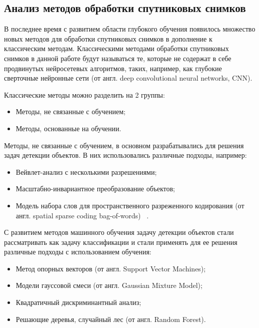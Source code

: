\documentclass[14pt, russian]{scrartcl}
\begin{document}
\subsection{Анализ методов обработки спутниковых снимков}

В последнее время с развитием области глубокого обучения появилось множество новых методов для обработки спутниковых снимков в дополнение к классическим методам. Классическими методами обработки спутниковых снимков в данной работе будут называться те, которые не содержат в себе продвинутых нейросетевых алгоритмов, таких, например, как глубокие сверточные нейронные сети (от англ. deep convolutional neural networks, CNN).

Классические методы можно разделить на 2 группы:

\begin{itemize}
    \item Методы, не связанные с обучением;
    \item Методы, основанные на обучении.
\end{itemize}

Методы, не связанные с обучением, в основном разрабатывались для решения задач детекции объектов. В них использовались различные подходы, например:

\begin{itemize}
    \item Вейвлет-анализ с несколькими разрешениями;
    \item Масштабно-инвариантное преобразование объектов;
    \item Модель набора слов для пространственного разреженного кодирования (от англ. spatial sparse coding bag-of-words) ~\cite{21}.
\end{itemize}

С развитием методов машинного обучения задачу детекции объектов стали рассматривать как задачу классификации и стали применять для ее решения различные подходы с использованием обучения:

\begin{itemize}
    \item Метод опорных векторов (от англ. Support Vector Machines);
    \item Модели гауссовой смеси (от англ. Gaussian Mixture Model);
    \item Квадратичный дискриминантный анализ;
    \item Решающие деревья, случайный лес (от англ. Random Forest).
\end{itemize}
\end{document}
